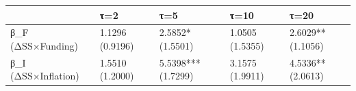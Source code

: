 \begin{tabular}{lllll}
\toprule
 & τ=2 & τ=5 & τ=10 & τ=20 \\
\midrule
β_F (ΔSS×Funding) & 1.1296
(0.9196) & 2.5852*
(1.5501) & 1.0505
(1.5355) & 2.6029**
(1.1056) \\
β_I (ΔSS×Inflation) & 1.5510
(1.2000) & 5.5398***
(1.7299) & 3.1575
(1.9911) & 4.5336**
(2.0613) \\
\bottomrule
\end{tabular}
